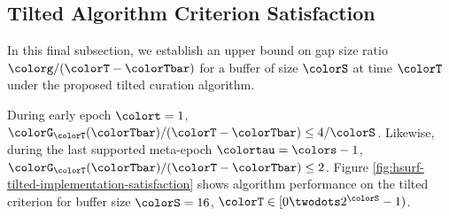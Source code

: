 \subsection{Tilted Algorithm Criterion Satisfaction}
\label{sec:tilted-satisfaction}

In this final subsection, we establish an upper bound on gap size ratio $\colorg/(\colorT - \colorTbar)$ for a buffer of size $\colorS$ at time $\colorT$ under the proposed tilted curation algorithm.



During early epoch $\colort = 1$, $\colorG_{\colorT}(\colorTbar)/(\colorT - \colorTbar) \leq 4/\colorS$.
Likewise, during the last supported meta-epoch $\colortau = \colors - 1$, $\colorG_{\colorT}(\colorTbar)/(\colorT - \colorTbar) \leq 2$.
Figure \ref{fig:hsurf-tilted-implementation-satisfaction} shows algorithm performance on the tilted criterion for buffer size $\colorS=16$, $\colorT \in [0\twodots 2^{\colorS} - 1)$.
